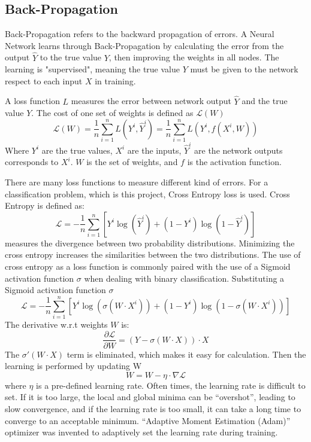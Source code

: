 \subsection{Back-Propagation}
Back-Propagation refers to the backward propagation of errors. A Neural Network learns through Back-Propagation by calculating the error from the output $\hat{Y}$ to the true value $Y$, then improving the weights in all nodes. The learning is "supervised", meaning the true value $Y$ must be given to the network respect to each input $X$ in training.

A loss function $L$ measures the error between network output $\hat{Y}$ and the true value $Y$. The cost of one set of weights is defined as $\mathcal{L}(W)$
$$\mathcal{L}(W)= \frac{\mathrm{1}}{n}\sum_{i=1}^{n} L(Y^i,\hat{Y}^i) = \frac{\mathrm{1}}{n}\sum_{i=1}^{n} L(Y^i,f(X^i,W))$$
Where $Y^i$ are the true values, $X^i$ are the inputs, $\hat{Y}^i$ are the network outputs corresponds to $X^i$. $W$ is the set of weights, and $f$ is the activation function.

There are many loss functions to measure different kind of errors. For a classification problem, which is this project, Cross Entropy loss is used. Cross Entropy is defined as:
$$\mathcal{L}=-\frac{\mathrm{1}}{n}\sum_{i=1}^{n}[Y^i \log(\hat{Y}^i)+(1-Y^i) \log(1-\hat{Y}^i)]$$
measures the divergence between two probability distributions. Minimizing the cross entropy increases the similarities between the two distributions. The use of cross entropy as a loss function is commonly paired with the use of a Sigmoid activation function $\sigma$ when dealing with binary classification. Substituting a Sigmoid activation function $\sigma$
$$\mathcal{L}=-\frac{\mathrm{1}}{n}\sum_{i=1}^{n}[Y^i \log(\sigma(W \cdot X^i))+(1-Y^i) \log(1-\sigma(W \cdot X^i))]$$
The derivative w.r.t weights $W$ is:
$$\frac{\partial \mathcal{L}}{\partial W} = (Y - \sigma(W \cdot X))\cdot X$$
The $\sigma'(W \cdot X)$ term is eliminated, which makes it easy for calculation.
Then the learning is performed by updating W
$$ W = W - \eta\cdot\nabla\mathcal{L}$$
where $\eta$ is a pre-defined learning rate. Often times, the learning rate is difficult to set. If it is too large, the local and global minima can be “overshot”, leading to slow convergence, and if the learning rate is too small, it can take a long time to converge to an acceptable minimum. “Adaptive Moment Estimation (Adam)” \citep{adam} optimizer was invented to adaptively set the learning rate during training.



